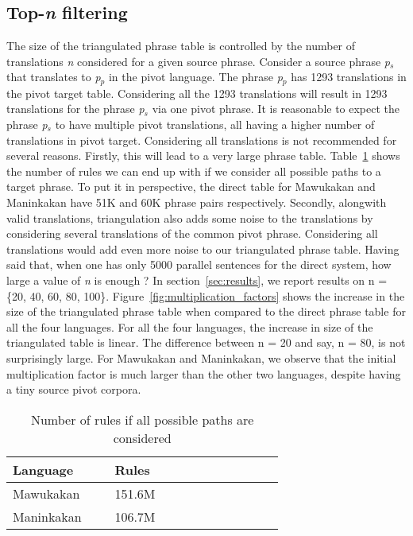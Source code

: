 \subsection{Top-\emph{n} filtering}
\label{subsec:topn}
 The size of the triangulated phrase table is controlled by the number of translations \emph{n} considered for a given source phrase. Consider a source phrase \emph{p$_s$} that translates to \emph{p$_p$} in the pivot language. The phrase \emph{p$_p$} has 1293 translations in the pivot target table. Considering all the 1293 translations will result in 1293 translations for the phrase \emph{p$_s$} via one pivot phrase. It is reasonable to expect the phrase \emph{p$_s$} to have multiple pivot translations, all having a higher number of translations in pivot target. Considering all translations is not recommended for several reasons. Firstly, this will lead to a very large phrase table. Table~\ref{table:allrules} shows the number of rules we can end up with if we consider all possible paths to a target phrase. To put it in perspective, the direct table for Mawukakan and Maninkakan have 51K and 60K phrase pairs respectively. Secondly, alongwith valid translations, triangulation also adds some noise to the translations by considering several translations of the common pivot phrase. Considering all translations would add even more noise to our triangulated phrase table. Having said that, when one has only 5000 parallel sentences for the direct system, how large a value of \emph{n} is enough ? In section~\ref{sec:results}, we report results on n = \{20, 40, 60, 80, 100\}. Figure~\ref{fig:multiplication_factors} shows the increase in the size of the triangulated phrase table when compared to the direct phrase table for all the four languages. For all the four languages, the increase in size of the triangulated table is linear. The difference between n = 20 and say, n = 80, is not surprisingly large. For Mawukakan and Maninkakan, we observe that the initial multiplication factor is much larger than the other two languages, despite having a tiny source pivot corpora.

        \begin{table}
                \centering
                \begin{tabular}{p{0.3\linewidth}p{0.5\linewidth}}
                \toprule
                Language &  Rules \\
                \toprule
                Mawukakan & 151.6M \\
                Maninkakan & 106.7M \\
                \bottomrule
                \end{tabular}
                \caption{Number of rules if all possible paths are considered}
                \label{table:allrules}
        \end{table}


